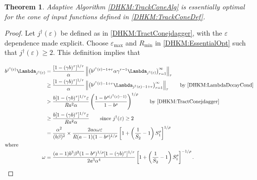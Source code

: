 \documentclass[USenglish]{article}
\theoremstyle{dgthm}
\newtheorem{theorem}{Theorem}
\theoremstyle{dgthm}
\theoremstyle{dgthm}
\theoremstyle{dgthm}
\theoremstyle{dgdef}
\theoremstyle{definition}
\newcommand{\norm}[2][{}]{\ensuremath{\left \lVert #2 \right \rVert}_{#1}}
\begin{document}
\begin{theorem}
\label{DHKM:TrackConeAlgOptThm}
Adaptive Algorithm \ref{DHKM:TrackConeAlg} is essentially optimal for the cone of input functions defined in \eqref{DHKM:TrackConeDef}.
\end{theorem}
\begin{proof}
Let $j^\dagger(\varepsilon)$ be defined as in \eqref{DHKM:TractConejdagger}, with the $\varepsilon$ dependence made explicit.  Choose $\varepsilon_{\max}$ and $R_{\min}$ in \eqref{DHKM:EssentialOpt} such that $j^\dagger(\varepsilon) \ge 2$.  This definition implies that

\begin{align*}
    b^{j^\dagger(\varepsilon)} \Lambda_{j^\dagger(\varepsilon) } 
   & = \frac{[1 - (\gamma b)^\tau]^{1/\tau}}{\alpha}
   \norm[\tau]{ \bigl(b^{j^\dagger(\varepsilon)-1+r} \alpha \gamma^{r-1} \Lambda_{j^\dagger(\varepsilon)} \bigr)_{r=1}^\infty}
    \\
    & \ge \frac{[1 - (\gamma b)^\tau]^{1/\tau}}{\alpha}  \norm[\tau]{ \bigl(b^{j^\dagger(\varepsilon)-1+r}\Lambda_{j^\dagger(\varepsilon)-1+r} \bigr)_{r=1}^\infty} \qquad \text{by \eqref{DHKM:LambdaDecayCond}} 
    \\
    &
    > \frac{b [1 - (\gamma b)^\tau]^{1/\tau} \varepsilon}{Ra^2 \alpha} \left( \frac{1 - b^{\rho(j^\dagger(\varepsilon)-1)}}{1 - b^\rho} \right)^{1/\rho} \qquad \text{by \eqref{DHKM:TractConejdagger}}
    \\
    &
    \ge \frac{b [1 - (\gamma b)^\tau]^{1/\tau} \varepsilon}{Ra^2 \alpha} \qquad \text{since } j^\dagger(\varepsilon) \ge 2
    \\
    & =   \frac{\alpha^2}{(b\beta)^2} \times \frac{2a \alpha \omega \varepsilon}{R(a-1)(1 - b^\rho)^{1/\rho}}  \left[1 + \left(\frac 1 {S_2} -1 \right) S_1^\rho \right]^{1/\rho}
    \\
    \intertext{where }
   \omega  & = \frac{(a-1)b^3 \beta^2 (1 - b^\rho)^{1/\rho} [1 - (\gamma b)^\tau]^{1/\tau}}{2a^3 \alpha^4 } \left[1 + \left(\frac 1 {S_2} -1 \right) S_1^\rho \right]^{-1/\rho}.
\end{align*}


\end{proof}
\end{document}
